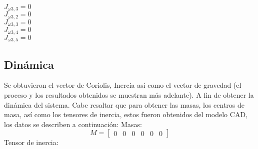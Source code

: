 \documentclass[journal]{IEEEtran}
\begin{document}
    \begin{flushleft}
        \(J_{\omega3 ,3} = 0 \) \\ \vspace{0.25cm}
        \(J_{\omega3, 2} = 0 \) \\ \vspace{0.25cm}
        \(J_{\omega3 ,3} = 0 \) \\ \vspace{0.25cm}
        \(J_{\omega3 ,4} = 0 \) \\ \vspace{0.25cm}
        \(J_{\omega3 ,5} = 0\) \\ \vspace{0.25cm}
    \end{flushleft}    
    
    \subsection{Dinámica}
    Se obtuvieron el vector de Coriolis, Inercia así como el vector de gravedad (el proceso y los resultados obtenidos se
    muestran más adelante). A fin de obtener la dinámica del sistema.
    Cabe resaltar que para obtener las masas, los centros de masa, así como los tensores de inercia, estos fueron obtenidos
    del modelo CAD, los datos se describen a continuación: 
    Masas:
    \begin{equation*}
        M = \begin{bmatrix} 0 & 0 & 0 & 0 & 0 & 0 \end{bmatrix}
    \end{equation*}
    Tensor de inercia: 
\end{document}
